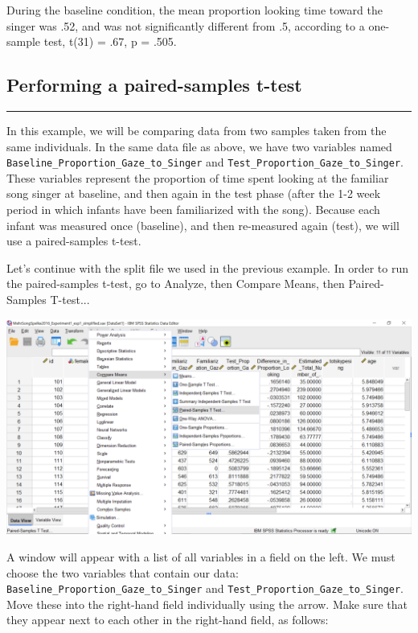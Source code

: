 \documentclass[]{book}
\begin{document}
During the baseline condition, the mean proportion looking time toward
the singer was .52, and was not significantly different from .5,
according to a one-sample test, t(31) = .67, p = .505.

\subsection{Performing a paired-samples
t-test}\label{performing-a-paired-samples-t-test}

\begin{center}\rule{0.5\linewidth}{0.5pt}\end{center}

In this example, we will be comparing data from two samples taken from
the same individuals. In the same data file as above, we have two
variables named \texttt{Baseline\_Proportion\_Gaze\_to\_Singer} and
\texttt{Test\_Proportion\_Gaze\_to\_Singer}. These variables represent
the proportion of time spent looking at the familiar song singer at
baseline, and then again in the test phase (after the 1-2 week period in
which infants have been familiarized with the song). Because each infant
was measured once (baseline), and then re-measured again (test), we will
use a paired-samples t-test.

Let's continue with the split file we used in the previous example. In
order to run the paired-samples t-test, go to {Analyze}, then {Compare
Means}, then {Paired-Samples T-test..}.

\includegraphics{img/6.4.17.png}

A window will appear with a list of all variables in a field on the
left. We must choose the two variables that contain our data:
\texttt{Baseline\_Proportion\_Gaze\_to\_Singer} and
\texttt{Test\_Proportion\_Gaze\_to\_Singer}. Move these into the
right-hand field individually using the arrow. Make sure that they
appear next to each other in the right-hand field, as follows:
\end{document}
